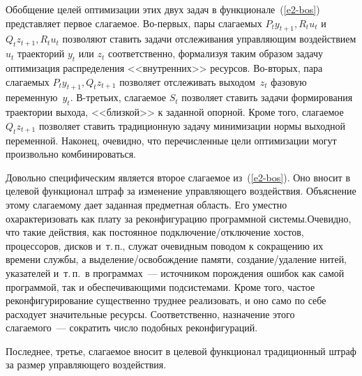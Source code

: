 \begin{multicols}{2}
 Обобщение целей оптимизации этих двух задач в функционале~(\ref{e2-bos})
 представляет первое слагаемое. Во-пер\-вых, пары слагаемых
$P_ty_{t+1},R_tu_t$ и $Q_tz_{t+1},R_tu_t$ позволяют ставить задачи
отслеживания управляющим воздействием $u_t$ траекторий $y_t$ или $z_t$
соответственно, формализуя таким образом задачу оптимизация распределения
<<внутренних>> ресурсов. Во-вто\-рых, пара слагаемых $P_t y_{t+1}, Q_t
z_{t+1}$ позволяет отслеживать выходом~$z_t$ фазовую переменную~$y_t$.
 В-третьих, слагаемое $S_t$ позволяет ставить задачи формирования
траектории выхода, <<близкой>> к заданной опорной. Кроме того, слагаемое
$Q_t z_{t+1}$ позволяет ставить традиционную задачу минимизации нормы
выходной переменной. Наконец, очевидно, что перечисленные цели
оптимизации могут произвольно комбинироваться.

 Довольно специфическим является второе слагаемое из~(\ref{e2-bos}).
Оно вносит в целевой функционал штраф за изменение управляющего
воздействия. Объяснение этому слагаемому дает заданная предметная область.
Его уместно охарактеризовать как плату за реконфигурацию программной
системы.\linebreak Очевидно, что такие действия, как постоянное\linebreak
 под\-клю\-че\-ние/от\-клю\-че\-ние хостов, процессоров, дисков и~т.\,п.,
служат очевидным поводом к сокращению их времени службы, а
 вы\-де\-ле\-ние/осво\-бож\-де\-ние памяти, создание/удаление нитей,
указателей и~т.\,п.\ в программах~--- источником порождения ошибок как
самой программой, так и обеспечи\-ва\-ющи\-ми подсистемами. Кроме того, частое
реконфигурирование существенно труднее реализовать, и оно само по себе
расходует значительные ресурсы. Соответственно, назначение этого
слагаемого~--- сократить число подобных реконфигураций.

 Последнее, третье, слагаемое вносит в целевой функционал
традиционный штраф за размер управ\-ля\-юще\-го воздействия.


\end{multicols}
